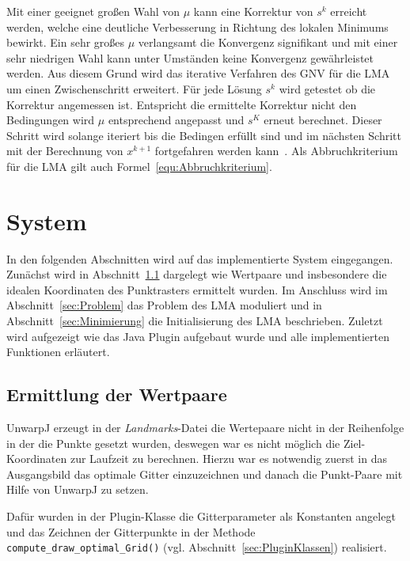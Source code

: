 Mit einer geeignet großen Wahl von $\mu$ kann eine Korrektur von $s^k$ erreicht werden, welche eine deutliche Verbesserung in Richtung des lokalen Minimums bewirkt. Ein sehr großes $\mu$ verlangsamt die Konvergenz signifikant und mit einer sehr niedrigen Wahl kann unter Umständen keine Konvergenz gewährleistet werden. Aus diesem Grund wird das iterative Verfahren des GNV für die LMA um einen Zwischenschritt erweitert. Für jede Lösung $s^k$ wird getestet ob die Korrektur angemessen ist. Entspricht die ermittelte Korrektur nicht den Bedingungen wird $\mu$ entsprechend angepasst und $s^K$ erneut berechnet. Dieser Schritt wird solange iteriert bis die Bedingen erfüllt sind und im nächsten Schritt mit der Berechnung von $x^{k+1}$ fortgefahren werden kann~\cite{dahmen2008numerik}. Als Abbruchkriterium für die LMA gilt auch Formel~\ref{equ:Abbruchkriterium}.

 

\section{System}
\label{sec:System}

In den folgenden Abschnitten wird auf das implementierte System eingegangen. Zunächst wird in Abschnitt~\ref{sec:Wertpaare} dargelegt wie Wertpaare und insbesondere die idealen Koordinaten des Punktrasters ermittelt wurden. Im Anschluss wird im Abschnitt~\ref{sec:Problem} das Problem des LMA moduliert und in Abschnitt~\ref{sec:Minimierung} die Initialisierung des LMA beschrieben. Zuletzt wird aufgezeigt wie das Java Plugin aufgebaut wurde und alle implementierten Funktionen erläutert.


\subsection{Ermittlung der Wertpaare}
\label{sec:Wertpaare}

UnwarpJ erzeugt in der \textit{Landmarks}-Datei die Wertepaare nicht in der Reihenfolge in der die Punkte gesetzt wurden, deswegen war es nicht möglich die Ziel-Koordinaten zur Laufzeit zu berechnen. Hierzu war es notwendig zuerst in das Ausgangsbild das optimale Gitter einzuzeichnen und danach die Punkt-Paare mit Hilfe von UnwarpJ zu setzen.

Dafür wurden in der Plugin-Klasse die Gitterparameter als Konstanten angelegt und das Zeichnen der Gitterpunkte in der Methode \texttt{compute\_draw\_optimal\_Grid()} (vgl. Abschnitt~\ref{sec:PluginKlassen}) realisiert.

